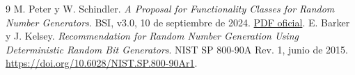 \documentclass[11pt,a4paper]{article}
\begin{document}
\begin{thebibliography}{9}
 M. Peter y W. Schindler.
\emph{A Proposal for Functionality Classes for Random Number Generators}.
BSI, v3.0, 10 de septiembre de 2024.
\href{https://www.bsi.bund.de/SharedDocs/Downloads/EN/BSI/Certification/Interpretations/AIS_31_Functionality_classes_for_random_number_generators_e_2024.pdf?__blob=publicationFile\&v=3}{PDF oficial}.
 E. Barker y J. Kelsey.
\emph{Recommendation for Random Number Generation Using Deterministic Random Bit Generators}.
NIST SP 800-90A Rev. 1, junio de 2015.
\url{https://doi.org/10.6028/NIST.SP.800-90Ar1}.
\end{thebibliography}
\end{document}
